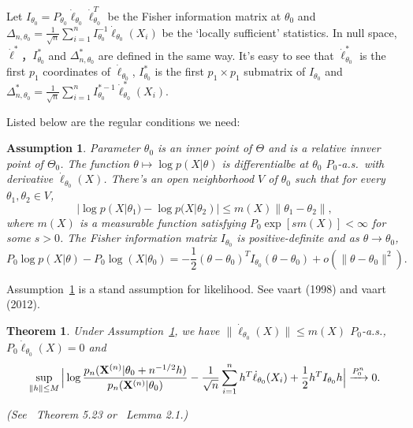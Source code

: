 \documentclass[3p]{elsarticle}
\theoremstyle{plain}
\newtheorem{theorem}{\quad\quad Theorem}
\newtheorem{assumption}{\quad\quad Assumption}
\theoremstyle{definition}
\theoremstyle{remark}
\begin{document}
Let $I_{\theta_0}=P_{\theta_0}\dot{\ell}_{\theta_0}\dot{\ell}_{\theta_0}^T$ be the Fisher information matrix at $\theta_0$ and $\Delta_{n,\theta_0}=\frac{1}{\sqrt{n}}\sum_{i=1}^n I_{\theta_0}^{-1}\dot{\ell}_{\theta_0}(X_i)$ be the `locally sufficient' statistics. In null space, $\dot{\ell}^*$，$I^*_{\theta_0}$ and $\Delta_{n,\theta_0}^*$ are defined in the same way. It's easy to see that $\dot{\ell}^*_{\theta_0}$ is the first $p_1$
coordinates of $\dot{\ell}_{\theta_0}$, $I^*_{\theta_0}$ is the  first $p_1\times p_1$ submatrix of $I_{\theta_0}$ and $\Delta_{n,\theta_0}^*=\frac{1}{\sqrt{n}}\sum_{i=1}^n I_{\theta_0}^{*-1}\dot{\ell}^*_{\theta_0}(X_i)$.


Listed below are the regular conditions we need:

\begin{assumption}\label{Assumption1}
Parameter $\theta_0$ is an inner point of $\Theta$ and is a relative innver point of $\Theta_0$.
The function $\theta \mapsto \log p(X|\theta)$ is differentialbe at $\theta_0$  $P_0$-a.s.\ with derivative $\dot{\ell}_{\theta_0}(X)$.
There's an open neighborhood $V$ of $\theta_0$ such that for every $\theta_1,\theta_2\in V$,
        \begin{equation*}
            |\log p(X|\theta_1)-\log p(X|\theta_2)|\leq m(X)\|\theta_1-\theta_2\|,
        \end{equation*}
        where $m(X)$ is a measurable function satisfying $P_{0}\exp[s m(X)]<\infty$ for some $s>0$.
The Fisher information matrix $I_{\theta_0}$ is positive-definite and as $\theta\to \theta_0$,
    \begin{equation*}
        P_0 \log p(X|\theta)- P_0 \log (X|\theta_0)
        =-\frac{1}{2}(\theta-\theta_0)^T I_{\theta_0} (\theta-\theta_0)+o(\|\theta-\theta_0\|^2).
    \end{equation*}
\end{assumption}     
Assumption~\ref{Assumption1} is a stand assumption for likelihood. See vaart (1998) and vaart (2012).
\begin{theorem}\label{Thm:localExpansion}
    Under Assumption~\ref{Assumption1},
    we have $\|\dot{\ell}_{\theta_0}(X)\|\leq m(X)$ $P_0$-a.s., $P_0 \dot{\ell}_{\theta_0}(X)=0$ and
    \begin{equation*}
        \sup_{\|h\|\leq M}\Big|
         \log \frac{p_n(\mathbf{X}^{(n)}|\theta_0+n^{-1/2}h)}{p_n(\mathbf{X}^{(n)}|\theta_0)}-\frac{1}{\sqrt{n}}\sum^n_{i=1}h^T\dot{\ell}_{\theta_0}(X_i)+\frac{1}{2}h^T I_{\theta_0}h
        \Big|\xrightarrow{P^n_0}0.
    \end{equation*}

    (See~\cite{van2000asymptotic} Theorem 5.23 or~\cite{Kleijn2012The} Lemma 2.1.)
\end{theorem}
\end{document}
